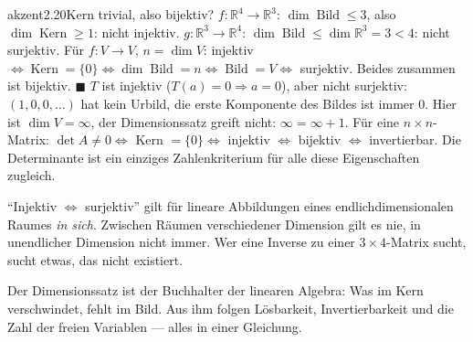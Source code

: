 \begin{loesungkarte}{akzent}{2.20}{Kern trivial, also bijektiv?}
$f\colon\mathbb R^{4}\to\mathbb R^{3}$: $\dim\operatorname{Bild}\le3$, also $\dim\operatorname{Kern}\ge1$: nicht injektiv. $g\colon\mathbb R^{3}\to\mathbb R^{4}$: $\dim\operatorname{Bild}\le\dim\mathbb R^{3} = 3 < 4$: nicht surjektiv.
Für $f\colon V\to V$, $n = \dim V$: injektiv $\iff\operatorname{Kern} = \{0\}\iff\dim\operatorname{Bild} = n\iff\operatorname{Bild} = V\iff$ surjektiv. Beides zusammen ist bijektiv. $\blacksquare$
$T$ ist injektiv ($T(a) = 0\Rightarrow a = 0$), aber nicht surjektiv: $(1, 0, 0, \dots)$ hat kein Urbild, die erste Komponente des Bildes ist immer $0$. Hier ist $\dim V = \infty$, der Dimensionssatz greift nicht: $\infty = \infty + 1$.
Für eine $n\times n$-Matrix: $\det A\neq0\iff$ Kern $= \{0\}\iff$ injektiv $\iff$ bijektiv $\iff$ invertierbar. Die Determinante ist ein einziges Zahlenkriterium für alle diese Eigenschaften zugleich.
\begin{fehler}\kastentext
\enquote{Injektiv $\iff$ surjektiv} gilt für lineare Abbildungen eines endlichdimensionalen Raumes \emph{in sich}. Zwischen Räumen verschiedener Dimension gilt es nie, in unendlicher Dimension nicht immer. Wer eine Inverse zu einer $3\times4$-Matrix sucht, sucht etwas, das nicht existiert.
\end{fehler}
\begin{mitnehmen}\kastentext
Der Dimensionssatz ist der Buchhalter der linearen Algebra: Was im Kern verschwindet, fehlt im Bild. Aus ihm folgen Lösbarkeit, Invertierbarkeit und die Zahl der freien Variablen --- alles in einer Gleichung.
\end{mitnehmen}
\end{loesungkarte}

